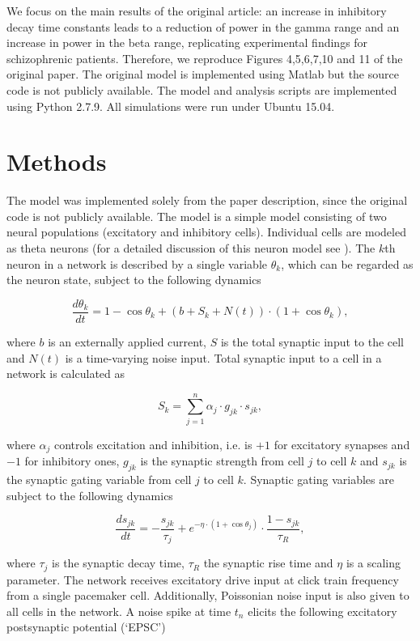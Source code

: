 \documentclass[10pt,a4paper,onecolumn]{article}
\begin{document}
We focus on the main results of the original article: an increase in
inhibitory decay time constants leads to a reduction of power in the
gamma range and an increase in power in the beta range, replicating
experimental findings for schizophrenic patients. Therefore, we
reproduce Figures 4,5,6,7,10 and 11 of the original paper. The original
model is implemented using Matlab but the source code is not publicly
available. The model and analysis scripts are implemented using Python
2.7.9. All simulations were run under Ubuntu 15.04.

\section{Methods}\label{methods}

The model was implemented solely from the paper description, since the
original code is not publicly available. The model is a simple model
consisting of two neural populations (excitatory and inhibitory cells).
Individual cells are modeled as theta neurons (for a detailed discussion
of this neuron model see \autocite{Boergers2003}). The $k$th neuron in a network is
described by a single variable \(\theta_k\), which can be regarded as the
neuron state, subject to the following dynamics

\[\frac{d \theta_k}{dt}=1-\cos \theta_k + (b+S_k+N(t))\cdot(1+ \cos \theta_k),\]

where \(b\) is an externally applied current, \(S\) is the total
synaptic input to the cell and \(N(t)\) is a time-varying noise input.
Total synaptic input to a cell in a network is calculated as

\[S_k = \sum_{j=1}^n \alpha_j \cdot g_{jk} \cdot s_{jk},\]

where \(\alpha _j\) controls excitation and inhibition, i.e. is $+1$ for excitatory synapses and $-1$ for inhibitory ones,
\(g_{jk}\)
is the synaptic strength from cell \(j\) to cell \(k\) and \(s_{jk}\) is
the synaptic gating variable from cell \(j\) to cell \(k\). Synaptic
gating variables are subject to the following dynamics

\[\frac{ds_{jk}}{dt}= - \frac{s _{jk}}{\tau _j} + e ^{- \eta \cdot (1+ \cos \theta _j)} \cdot \frac{1-s _{jk}}{\tau _R},\]

where \(\tau _j\) is the synaptic decay time, \(\tau_R\) the synaptic
rise time and \(\eta\) is a scaling parameter. The network receives excitatory drive input at click train
frequency from a single pacemaker cell. Additionally, Poissonian noise
input is also given to all cells in the network. A noise spike at time
\(t_n\) elicits the following excitatory postsynaptic potential (`EPSC')
\end{document}
